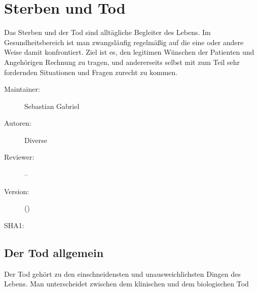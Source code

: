 % 
\def\ChapterCode{TOD}
\chapter
[\CO{[TOD]} Sterben und Tod]
{Sterben und Tod}
\label{chp:TOD}

\ChapterIntro
{%
\noindent Das Sterben und der Tod sind alltägliche Begleiter
des Lebens. Im Gesundheitsbereich ist man zwangsläufig
regelmäßig auf die eine oder andere Weise damit
konfrontiert. Ziel ist es, den legitimen Wünschen der
Patienten und Angehörigen Rechnung zu tragen, und
andererseits selbst mit zum Teil sehr fordernden Situationen
und Fragen zurecht zu kommen.
}
{%
\begin{description}
  \item[Maintainer:] Sebastian Gabriel
  \item[Autoren:] Diverse
  \item[Reviewer:] --
  \item[Version:] {\DocVersion} ({\DocVersionInfo})
  \item[SHA1:] {\DocGitCommit}
\end{description}

{\TxTeilkapitelAASS}
}


\section{Der Tod allgemein}
\label{topic:tod}


Der Tod gehört zu den einschneidensten und
unausweichlichsten Dingen des Lebens. 
Man
unterscheidet zwischen dem klinischen und dem biologischen
Tod

